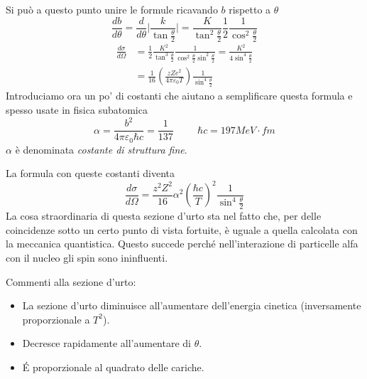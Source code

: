 Si può a questo punto unire le formule ricavando $b$ rispetto a $\theta$ 
\begin{equation}
\frac{db}{d\theta}=\frac{d}{d\theta}\biggl|\frac{k}{\tan\frac{\theta}{2}}\biggl|=\frac{K}{\tan^2 \frac{\theta}{2}}\frac{1}{2}\frac{1}{\cos^2\frac{\theta}{2}}
\end{equation}
\begin{equation}
\begin{split}
\frac{d\sigma}{d\Omega}&=\frac{1}{2}\frac{K^2}{\tan^3 \frac{\theta}{2}}\frac{1}{\cos^2\frac{\theta}{2}\sin^2\frac{\theta}{2}}=\frac{K^2}{4\sin^4\frac{\theta}{2}}\\
&=\frac{1}{16}\left(\frac{zZe^2}{4\pi\varepsilon_0 T}\right)\frac{1}{\sin^4\frac{\theta}{2}}
\end{split}
\end{equation}
Introduciamo ora un po' di costanti che aiutano a semplificare questa formula e spesso usate in fisica subatomica
\begin{equation}
\alpha=\frac{b^2}{4\pi\varepsilon_0\hbar c}=\frac{1}{137}\hspace{1cm}\hbar c=197 MeV\cdot fm
\end{equation}
$\alpha$ è denominata \emph{costante di struttura fine}. 

La formula con queste costanti diventa
\begin{equation}
\frac{d\sigma}{d\Omega}=\frac{z^2Z^2}{16}\alpha^2\left(\frac{\hbar c}{T}\right)^2 \frac{1}{\sin^4\frac{\theta}{2}}
\end{equation}
La cosa straordinaria di questa sezione d'urto sta nel fatto che, per delle coincidenze sotto un certo punto di vista fortuite, è uguale a quella calcolata con la meccanica quantistica. Questo succede perché nell'interazione di particelle alfa con il nucleo gli spin sono ininfluenti. 

Commenti alla sezione d'urto:
\begin{itemize}
\item La sezione d'urto diminuisce all'aumentare dell'energia cinetica (inversamente proporzionale a $T^2$).
\item Decresce rapidamente all'aumentare di $\theta$.
\item \'E proporzionale al quadrato delle cariche.
\end{itemize}


